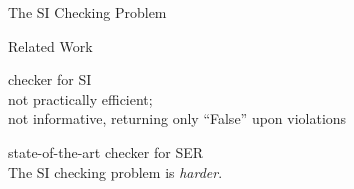 \begin{frame}{The SI Checking Problem}
  \begin{center}

    \vspace{0.20cm}

    \vspace{0.30cm}
    
    \vspace{0.30cm}


    \vspace{0.20cm}
  \end{center}
\end{frame}

\begin{frame}{Related Work}
  \begin{description}
    \setlength{\itemsep}{15pt}
    \item[dbcop~\ncite{Complexity:OOPSLA2019}] checker for SI \\[2pt]
      not practically efficient; \\[2pt]
      not informative, returning only ``\textsf{False}'' upon violations
    \item[Cobra~\ncite{Cobra:OSDI2020}] state-of-the-art checker for SER \\[2pt]
      The SI checking problem is {\it harder}.
  \end{description}
\end{frame}

